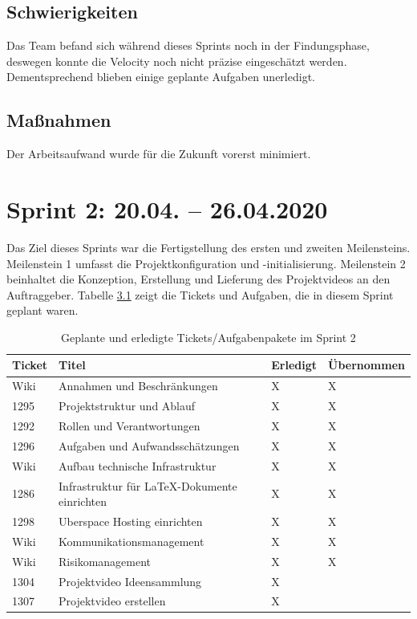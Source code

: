 \documentclass[a4paper,11pt,listof=numbered,glossary=totoc,parskip=half,toc=bib]{scrreprt}
\begin{document}
    \section{Schwierigkeiten}
    Das Team befand sich während dieses Sprints noch in der Findungsphase, deswegen konnte die Velocity noch nicht präzise eingeschätzt werden. Dementsprechend blieben einige geplante Aufgaben unerledigt.
    
    \section{Maßnahmen}
    Der Arbeitsaufwand wurde für die Zukunft vorerst minimiert.  
    
    \chapter{Sprint 2: 20.04. – 26.04.2020}

Das Ziel dieses Sprints war die Fertigstellung des ersten und zweiten Meilensteins. Meilenstein 1 umfasst die Projektkonfiguration und -initialisierung. Meilenstein 2 beinhaltet die Konzeption, Erstellung und Lieferung des Projektvideos an den Auftraggeber. Tabelle \ref{tab:sprint2} zeigt die Tickets und Aufgaben, die in diesem Sprint geplant waren.

\begin{table}    
    \begin{tabularx}{\textwidth}{lXll}
			\toprule
			\textbf{Ticket} & \textbf{Titel} & \textbf{Erledigt} & \textbf{Übernommen} \\
			\midrule
Wiki	&	Annahmen und Beschränkungen	&	X	&	X	\\
1295	&	Projektstruktur und Ablauf	&	X	&	X	\\
1292	&	Rollen und Verantwortungen	&	X	&	X	\\
1296	&	Aufgaben und Aufwandsschätzungen	&	X	&	X	\\
Wiki	&	Aufbau technische Infrastruktur	&	X	&	X	\\
1286	&	Infrastruktur für LaTeX-Dokumente einrichten	&	X	&	X	\\
1298	&	Uberspace Hosting einrichten	&	X	&	X	\\
Wiki	&	Kommunikationsmanagement	&	X	&	X	\\
Wiki	&	Risikomanagement	&	X	&	X	\\
1304	&	Projektvideo Ideensammlung	&	X	&		\\
1307	&	Projektvideo erstellen	&	X	&		\\
			\bottomrule
		\end{tabularx}
\caption{Geplante und erledigte Tickets/Aufgabenpakete im Sprint 2}
\label{tab:sprint2}
\end{table}
   
\end{document}
